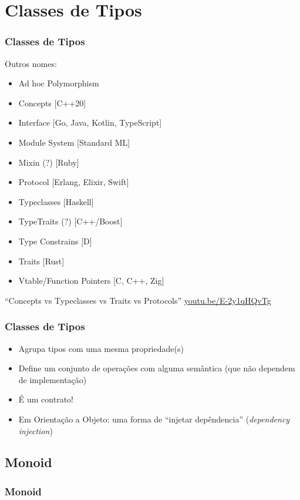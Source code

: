 \documentclass{beamer}
\begin{document}
\section{Classes de Tipos}
\begin{frame}
    \frametitle{Classes de Tipos}
    Outros nomes:
    \begin{itemize}
        \item Ad hoc Polymorphism
        \item Concepts [C++20]
        \item Interface [Go, Java, Kotlin, TypeScript]
        \item Module System [Standard ML]
        \item Mixin (?) [Ruby]
        \item Protocol [Erlang, Elixir, Swift]
        \item Typeclasses [Haskell]
        \item TypeTraits (?) [C++/Boost]
        \item Type Constrains [D]
        \item Traits [Rust]
        \item Vtable/Function Pointers [C, C++, Zig]
    \end{itemize}
    \vfill
    ``Concepts vs Typeclasses vs Traits vs Protocols''
    \url{youtu.be/E-2y1qHQvTg}
\end{frame}

\begin{frame}
    \frametitle{Classes de Tipos}
    \begin{itemize}
        \item Agrupa tipos com uma mesma propriedade(s)
            \vfill
        \item Define um conjunto de operações
            com alguma semântica
            (que não dependem de implementação)
            \vfill
        \item É um contrato!
            \vfill
        \item Em Orientação a Objeto:
            uma forma de ``injetar depêndencia''
            (\emph{dependency injection})
    \end{itemize}
\end{frame}

\subsection{Monoid}
\begin{frame}
    \frametitle{Monoid}
\end{frame}
\end{document}
